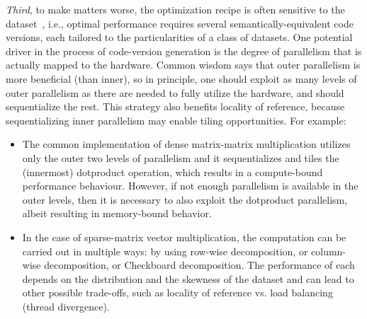 
{\em Third}, to make matters worse, the optimization recipe is often sensitive to the dataset~\cite{FinPar:TACO}, i.e., optimal performance requires several semantically-equivalent code versions, each tailored to the particularities of a class of datasets.   One potential driver in the process of code-version generation is the degree of parallelism that is actually mapped to the hardware. Common wisdom says that outer parallelism is more beneficial (than inner), so in principle, one should exploit as many levels of outer parallelism as there are needed to fully utilize the hardware, and should sequentialize the rest.  This strategy also benefits locality of reference, because sequentializing inner parallelism may enable tiling opportunities. For example:
\begin{itemize}
    \item The common implementation of dense matrix-matrix multiplication utilizes only the outer two levels of parallelism and it sequentializes and tiles the (innermost) dotproduct operation, which results in a compute-bound performance behaviour.   However, if not enough parallelism is available in the outer levels, then it is necessary to also exploit the dotproduct parallelism, albeit resulting in memory-bound behavior.
    \item In the case of sparse-matrix vector multiplication, the computation can be carried out in multiple ways: by using row-wise decomposition, or column-wise decomposition, or Checkboard decomposition.   The performance of each depends on the distribution and the skewness of the dataset and can lead to other possible trade-offs, such as locality of reference vs. load balancing (thread divergence).
\end{itemize}

